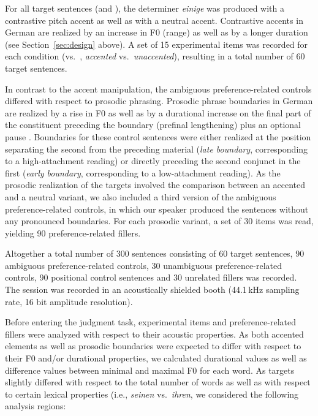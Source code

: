 \documentclass[fleqn,reqno,10pt,draft]{article}
\newcommand{\as}{\acro{as}}
\renewcommand{\es}{\acro{es}}
\begin{document}
For all target sentences (\as and \es), the determiner \emph{einige} was
produced with a contrastive pitch accent as well as with a neutral
accent. Contrastive accents in German are realized by an increase in F0 (range)
as well as by a longer duration (see Section~\ref{sec:design} above). A set of 15 
experimental items was recorded for each condition (\as vs.~\es, \emph{accented} 
vs.~\emph{unaccented}), resulting in a total number of 60 target sentences.

In contrast to the accent manipulation, the ambiguous preference-related controls
differed with respect to prosodic phrasing. Prosodic phrase boundaries
in German are realized by a rise in F0 as well as by a durational
increase on the final part of the constituent preceding the boundary
(prefinal lengthening) plus an optional pause \citep[e.g.][]{Vaissiere83,Fery93}.
Boundaries for these control sentences were either realized at the position 
separating the second {\small {}}
from the preceding material (\emph{late boundary}, corresponding to a
high-attachment reading) or directly preceding the second conjunct in
the first {\small {}} (\emph{early boundary}, corresponding to a
low-attachment reading). As the prosodic realization of the targets
involved the comparison between an accented and a neutral variant, we
also included a third version of the ambiguous preference-related controls, in which our
speaker produced the sentences without any pronounced
boundaries. For each prosodic variant, a set of
30 items was read, yielding 90 preference-related fillers.

Altogether a total number of 300 sentences consisting of 60 target sentences, 90 ambiguous preference-related controls, 30 unambiguous preference-related controls, 90 positional control sentences and 30 unrelated fillers was recorded. The session was recorded in an acoustically
shielded booth (44.1\,kHz sampling rate, 16 bit amplitude resolution).

Before entering the judgment task, experimental items and
preference-related fillers were analyzed with respect to their acoustic
properties. As both accented elements as well as prosodic boundaries
were expected to differ with respect to their F0 and/or durational
properties, we calculated durational values as well as difference
values between minimal and maximal F0 for each word. As targets
slightly differed with respect to the total number of words as well as
with respect to certain lexical properties (i.e., \emph{seinen}
vs.~\emph{ihren}, we considered the following analysis regions:
\end{document}
